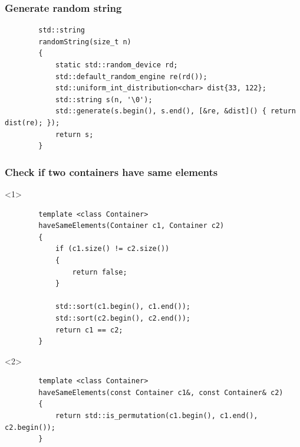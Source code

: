 \documentclass{beamer}
\begin{document}
\begin{frame}[fragile]
\frametitle{Generate random string}
    \begin{lstlisting}
        std::string
        randomString(size_t n)
        {
            static std::random_device rd;
            std::default_random_engine re(rd());
            std::uniform_int_distribution<char> dist{33, 122};
            std::string s(n, '\0');
            std::generate(s.begin(), s.end(), [&re, &dist]() { return dist(re); });
            return s;
        }
    \end{lstlisting}
\end{frame}

\begin{frame}[fragile]
\frametitle{Check if two containers have same elements}
    \begin{onlyenv}<1>
    \begin{lstlisting}
        template <class Container>
        haveSameElements(Container c1, Container c2)
        {
            if (c1.size() != c2.size())
            {
                return false;
            }

            std::sort(c1.begin(), c1.end());
            std::sort(c2.begin(), c2.end());
            return c1 == c2;
        }
    \end{lstlisting}
    \end{onlyenv}

    \begin{onlyenv}<2>
    \begin{lstlisting}
        template <class Container>
        haveSameElements(const Container c1&, const Container& c2)
        {
            return std::is_permutation(c1.begin(), c1.end(), c2.begin());
        }
    \end{lstlisting}
    \end{onlyenv}
\end{frame}
\end{document}
